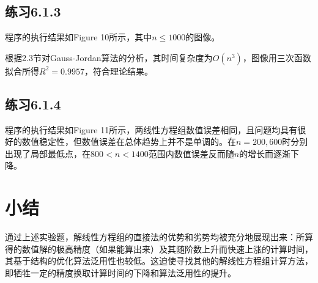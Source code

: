 \documentclass[UTF8,a4paper,10pt]{ctexart}
\begin{document}
    \subsection{练习6.1.3}
        \par
        程序的执行结果如Figure 10所示，其中$n\le 1000$的图像。
        \par
        根据2.3节对Gauss-Jordan算法的分析，其时间复杂度为$O(n^3)$，图像用三次函数拟合所得$R^2=0.9957$，符合理论结果。

    \subsection{练习6.1.4}
        \par
        程序的执行结果如Figure 11所示，两线性方程组数值误差相同，且问题均具有很好的数值稳定性，但数值误差在总体趋势上并不是单调的。在$n=200,600$时分别出现了局部最低点，在$800<n<1400$范围内数值误差反而随$n$的增长而逐渐下降。

\section{小结}
    \par
    通过上述实验题，解线性方程组的直接法的优势和劣势均被充分地展现出来：所算得的数值解的极高精度（如果能算出来）及其随阶数上升而快速上涨的计算时间，其基于结构的优化算法泛用性也较低。这迫使寻找其他的解线性方程组计算方法，即牺牲一定的精度换取计算时间的下降和算法泛用性的提升。
    
\end{document}
